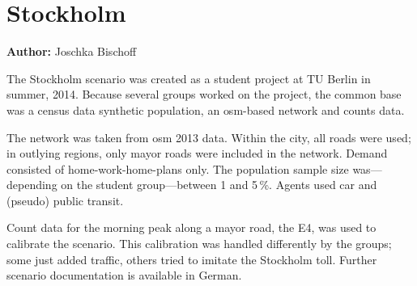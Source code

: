 \section{Stockholm}
\label{sec:stockholm}
\hfill \textbf{Author:} Joschka Bischoff


The Stockholm scenario was created as a student project at TU Berlin in summer, 2014. Because several groups worked on the project, the common base was a census data synthetic population, an \gls{osm}-based network and counts data.

The network was taken from \gls{osm} 2013 data. Within the city, all roads were used; in outlying regions, only mayor roads were included in the network. Demand consisted of home-work-home-plans only. The population sample size was---depending on the student group---between 1 and 5\,\%. Agents used car and (pseudo) public transit.

Count data for the morning peak along a mayor road, the E4, was used to calibrate the scenario. This calibration was handled differently by the groups; some just added traffic, others tried to imitate the Stockholm toll. Further scenario documentation is available in German. 

